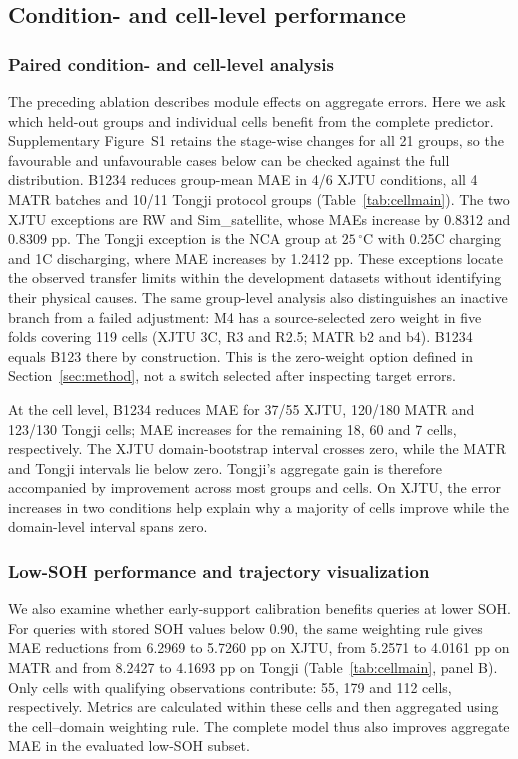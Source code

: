 \documentclass[preprint,12pt]{elsarticle}
\begin{document}
\subsection{Condition- and cell-level performance}
\subsubsection{Paired condition- and cell-level analysis}
The preceding ablation describes module effects on aggregate errors. Here we ask which held-out groups and individual cells benefit from the complete predictor. Supplementary Figure~S1 retains the stage-wise changes for all 21 groups, so the favourable and unfavourable cases below can be checked against the full distribution. B1234 reduces group-mean MAE in 4/6 XJTU conditions, all 4 MATR batches and 10/11 Tongji protocol groups (Table~\ref{tab:cellmain}). The two XJTU exceptions are RW and Sim\_satellite, whose MAEs increase by 0.8312 and 0.8309 pp. The Tongji exception is the NCA group at $25\,^{\circ}\mathrm C$ with 0.25C charging and 1C discharging, where MAE increases by 1.2412 pp. These exceptions locate the observed transfer limits within the development datasets without identifying their physical causes. The same group-level analysis also distinguishes an inactive branch from a failed adjustment: M4 has a source-selected zero weight in five folds covering 119 cells (XJTU 3C, R3 and R2.5; MATR b2 and b4). B1234 equals B123 there by construction. This is the zero-weight option defined in Section~\ref{sec:method}, not a switch selected after inspecting target errors.

At the cell level, B1234 reduces MAE for 37/55 XJTU, 120/180 MATR and 123/130 Tongji cells; MAE increases for the remaining 18, 60 and 7 cells, respectively. The XJTU domain-bootstrap interval crosses zero, while the MATR and Tongji intervals lie below zero. Tongji's aggregate gain is therefore accompanied by improvement across most groups and cells. On XJTU, the error increases in two conditions help explain why a majority of cells improve while the domain-level interval spans zero.



\subsubsection{Low-SOH performance and trajectory visualization}
We also examine whether early-support calibration benefits queries at lower SOH. For queries with stored SOH values below 0.90, the same weighting rule gives MAE reductions from 6.2969 to 5.7260 pp on XJTU, from 5.2571 to 4.0161 pp on MATR and from 8.2427 to 4.1693 pp on Tongji (Table~\ref{tab:cellmain}, panel B). Only cells with qualifying observations contribute: 55, 179 and 112 cells, respectively. Metrics are calculated within these cells and then aggregated using the cell--domain weighting rule. The complete model thus also improves aggregate MAE in the evaluated low-SOH subset.
\end{document}
